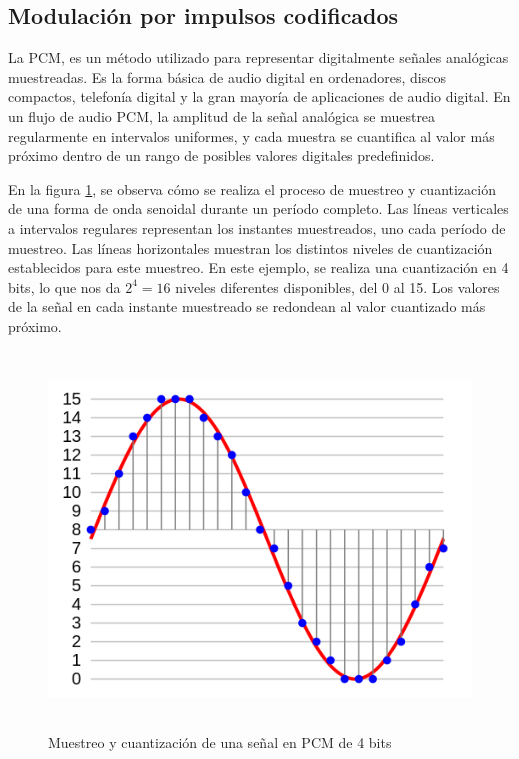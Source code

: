 \subsection{Modulación por impulsos codificados}

La \ac{PCM}, es un método utilizado para representar digitalmente señales analógicas muestreadas. Es la forma básica de audio digital en ordenadores, discos compactos, telefonía digital y la gran mayoría de aplicaciones de audio digital. En un flujo de audio \ac{PCM}, la amplitud de la señal analógica se muestrea regularmente en intervalos uniformes, y cada muestra se cuantifica al valor más próximo dentro de un rango de posibles valores digitales predefinidos.

En la figura \ref{fig:diagrama:PCM}, se observa cómo se realiza el proceso de muestreo y cuantización de una forma de onda senoidal durante un período completo. Las líneas verticales a intervalos regulares representan los instantes muestreados, uno cada período de muestreo. Las líneas horizontales muestran los distintos niveles de cuantización establecidos para este muestreo. En este ejemplo, se realiza una cuantización en 4 bits, lo que nos da $2^4=16$ niveles diferentes disponibles, del 0 al 15. Los valores de la señal en cada instante muestreado se redondean al valor cuantizado más próximo.

\begin{figure}[h] \centering
    \includegraphics[height=10cm]{graphs/Pcm.png} \caption{Muestreo y cuantización de una señal en PCM de 4 bits\cite{wikiPCM}}\label{fig:diagrama:PCM}
\end{figure}

